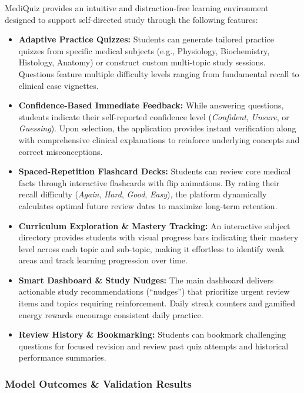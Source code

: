 MediQuiz provides an intuitive and distraction-free learning environment designed to support self-directed study through the following features:

\begin{itemize}
    \item \textbf{Adaptive Practice Quizzes:} Students can generate tailored practice quizzes from specific medical subjects (e.g., Physiology, Biochemistry, Histology, Anatomy) or construct custom multi-topic study sessions. Questions feature multiple difficulty levels ranging from fundamental recall to clinical case vignettes.
    \item \textbf{Confidence-Based Immediate Feedback:} While answering questions, students indicate their self-reported confidence level (\textit{Confident}, \textit{Unsure}, or \textit{Guessing}). Upon selection, the application provides instant verification along with comprehensive clinical explanations to reinforce underlying concepts and correct misconceptions.
    \item \textbf{Spaced-Repetition Flashcard Decks:} Students can review core medical facts through interactive flashcards with flip animations. By rating their recall difficulty (\textit{Again}, \textit{Hard}, \textit{Good}, \textit{Easy}), the platform dynamically calculates optimal future review dates to maximize long-term retention.
    \item \textbf{Curriculum Exploration \& Mastery Tracking:} An interactive subject directory provides students with visual progress bars indicating their mastery level across each topic and sub-topic, making it effortless to identify weak areas and track learning progression over time.
    \item \textbf{Smart Dashboard \& Study Nudges:} The main dashboard delivers actionable study recommendations (``nudges'') that prioritize urgent review items and topics requiring reinforcement. Daily streak counters and gamified energy rewards encourage consistent daily practice.
    \item \textbf{Review History \& Bookmarking:} Students can bookmark challenging questions for focused revision and review past quiz attempts and historical performance summaries.
\end{itemize}

\subsubsection*{Model Outcomes \& Validation Results}

